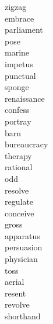 \documentclass[b5paper, 11pt]{ctexart}
\begin{document}
\begin{multicols*}{3}
\begin{description}
\item[zigzag]

\item[embrace]

\item[parliament]

\item[pose]

\item[marine]

\item[impetus]

\item[punctual]

\item[sponge]

\item[renaissance]

\item[confess]

\item[portray]

\item[barn]

\item[bureaucracy]

\item[therapy]

\item[rational]

\item[odd]

\item[resolve]

\item[regulate]

\item[conceive]

\item[gross]

\item[apparatus]

\item[persuasion]

\item[physician]

\item[toss]

\item[aerial]

\item[resent]

\item[revolve]

\item[shorthand]


\end{description}
\end{multicols*}
\end{document}
